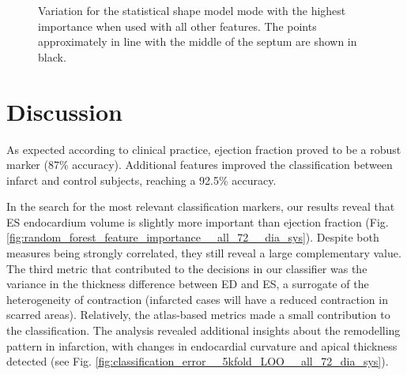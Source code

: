\documentclass{llncs}
\begin{document}
	\begin{figure}[]	
	\!		
\begin{center}   
\qquad
{}


\caption{ Variation for the statistical shape model mode with the highest importance when used with all other features. The points approximately in line with the middle of the septum are shown in black. }
\label{fig:visualise_shapes}
\end{center}
		\end{figure}

\section{Discussion}

As expected according to clinical practice, ejection fraction proved to be a robust marker (87\% accuracy). Additional features improved the classification between infarct and control subjects, reaching a 92.5\% accuracy. 

In the search for the most relevant classification markers, our results reveal that ES endocardium volume is slightly more important than ejection fraction (Fig. \ref{fig:random_forest_feature_importance__all_72__dia_sys}). Despite both measures being strongly correlated, they still reveal a large complementary value. The third metric that contributed to the decisions in our classifier was the variance in the thickness difference between ED and ES, a surrogate of the heterogeneity of contraction (infarcted cases will have a reduced contraction in scarred areas). Relatively, the atlas-based metrics made a small contribution to the classification. The analysis revealed additional insights about the remodelling pattern in infarction, with changes in endocardial curvature and apical thickness detected (see Fig. \ref{fig:classification_error__5kfold_LOO__all_72_dia_sys}).
\end{document}
